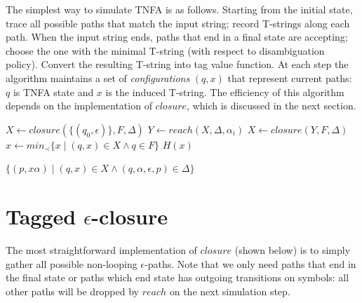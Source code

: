 \documentclass{article}
\newcommand{\Xset}{\!\leftarrow\!}
\newcommand{\Xin}{\!\in\!}
\newcommand{\Xeq}{\!=\!}
\theoremstyle{definition}
\begin{document}
\begin{multicols}{2}
The simplest way to simulate TNFA is as follows.
Starting from the initial state, trace all possible paths that match the input string; record T-strings along each path.
When the input string ends, paths that end in a final state are accepting;
choose the one with the minimal T-string (with respect to disambiguation policy).
Convert the resulting T-string into tag value function.
At each step the algorithm maintains a set of \emph{configurations} $(q, x)$ that represent current paths:
$q$ is TNFA state and $x$ is the induced T-string.
The efficiency of this algorithm depends on the implementation of $closure$, which is discussed in the next section.
\\

    \begin{algorithm}[H] \DontPrintSemicolon {} 
     {
        $X \Xset closure(\{ (q_0, \epsilon) \}, F, \Delta)$ \;
        \For {$i \Xeq \overline{1,n}$} {
            $Y \Xset reach(X, \Delta, \alpha_i)$ \;
            $X \Xset closure(Y, F, \Delta)$ \;
        }
        $x \Xset min_\prec\{ x \mid (q, x) \Xin X \wedge q \Xin F \}$ \;
        \Return $H(x)$ \;
    }
    \end{algorithm}

    \begin{algorithm}[H] \DontPrintSemicolon {} 
     {
        \Return $\{ (p, x \alpha) \mid (q, x) \Xin X \wedge (q, \alpha, \epsilon, p) \Xin \Delta \}$
    }
    \end{algorithm}

\section{Tagged $\epsilon$-closure}\label{section_closure}

The most straightforward implementation of $closure$ (shown below)
is to simply gather all possible non-looping $\epsilon$-paths.
Note that we only need paths that end in the final state
or paths which end state has outgoing transitions on symbols:
all other paths will be dropped by $reach$ on the next simulation step.
\\


\end{multicols}
\end{document}

